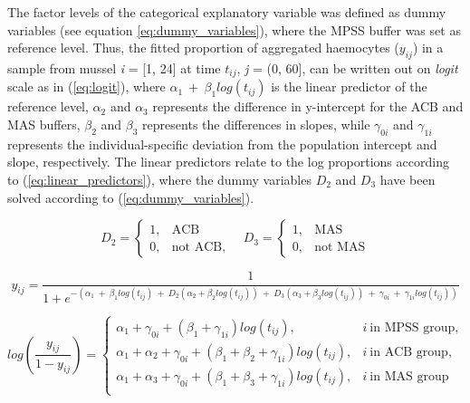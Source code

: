 The factor levels of the categorical explanatory variable was defined as dummy variables (see equation \ref{eq:dummy_variables}), where the MPSS buffer was set as reference level. Thus, the fitted proportion of aggregated haemocytes ($y_{ij}$) in a sample from mussel \emph{i} = [1, 24] at time $t_{ij}$, \emph{j} = (0, 60], can be written out on \emph{logit} scale as in (\ref{eq:logit}), where $\alpha_{1} \: + \: \beta_{1}log(t_{ij})$ is the linear predictor of the reference level, $\alpha_{2}$ and $\alpha_{3}$ represents the difference in y-intercept for the ACB and MAS buffers, $\beta_{2}$ and $\beta_{3}$ represents the differences in slopes, while $\gamma_{0i}$ and $\gamma_{1i}$ represents the individual-specific deviation from the population intercept and slope, respectively. The linear predictors relate to the log proportions according to (\ref{eq:linear_predictors}), where the dummy variables $D_{2}$ and $D_{3}$ have been solved according to (\ref{eq:dummy_variables}).

\begin{equation}
    \label{eq:dummy_variables}
D_{2} =\begin{cases}
      1, & \text{ACB}\\
      0, & \text{not ACB},
    \end{cases}
    \quad
D_{3} =\begin{cases}
      1, & \text{MAS}\\
      0, & \text{not MAS}
    \end{cases}
\end{equation}

\begin{equation}
\label{eq:logit}
y_{ij} = \dfrac{1}{1 + e^{-(\alpha_{1} \: + \: \beta_{1} log(t_{ij}) \: + \: D_{2}(\alpha_{2} + \beta_{2}log(t_{ij})) \: + \:  D_{3}(\alpha_{3} + \beta_{3}log(t_{ij})) \: + \: \gamma_{0i} \: + \: \gamma_{1i}log(t_{ij}))}}
\end{equation}

\begin{equation}
    \label{eq:linear_predictors}
    log(\dfrac{y_{ij}}{1-y_{ij}}) = \begin{cases}
        \alpha_{1} + \gamma_{0i} + (\beta_{1} + \gamma_{1i})log(t_{ij}), & i \: \text{in MPSS group}, \\
        \alpha_{1} + \alpha_{2} + \gamma_{0i} + (\beta_{1} + \beta_{2} + \gamma_{1i})log(t_{ij}), & i \: \text{in ACB group}, \\
        \alpha_{1} + \alpha_{3} + \gamma_{0i} + (\beta_{1} + \beta_{3} + \gamma_{1i})log(t_{ij}), & i \: \text{in MAS group} \\
    \end{cases}
\end{equation}

